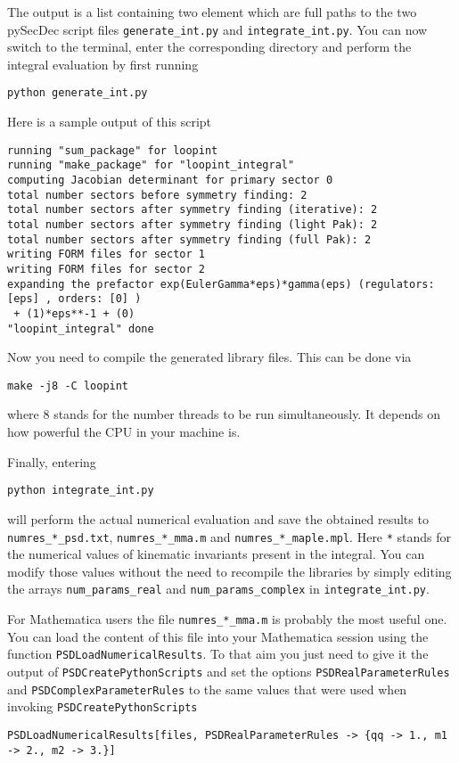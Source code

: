 \documentclass[../FeynHelpersManual.tex]{subfiles}
\begin{document}
The output is a list containing two element which are full paths to the
two pySecDec script files \texttt{generate_int.py} and
\texttt{integrate_int.py}. You can now switch to the terminal, enter the
corresponding directory and perform the integral evaluation by first
running

\begin{verbatim}
python generate_int.py
\end{verbatim}

Here is a sample output of this script

\begin{verbatim}
running "sum_package" for loopint
running "make_package" for "loopint_integral"
computing Jacobian determinant for primary sector 0
total number sectors before symmetry finding: 2
total number sectors after symmetry finding (iterative): 2
total number sectors after symmetry finding (light Pak): 2
total number sectors after symmetry finding (full Pak): 2
writing FORM files for sector 1
writing FORM files for sector 2
expanding the prefactor exp(EulerGamma*eps)*gamma(eps) (regulators: [eps] , orders: [0] )
 + (1)*eps**-1 + (0)
"loopint_integral" done
\end{verbatim}

Now you need to compile the generated library files. This can be done
via

\begin{verbatim}
make -j8 -C loopint
\end{verbatim}

where 8 stands for the number threads to be run simultaneously. It
depends on how powerful the CPU in your machine is.

Finally, entering

\begin{verbatim}
python integrate_int.py
\end{verbatim}

will perform the actual numerical evaluation and save the obtained
results to \texttt{numres_*_psd.txt}, \texttt{numres_*_mma.m} and
\texttt{numres_*_maple.mpl}. Here \texttt{*} stands for the numerical
values of kinematic invariants present in the integral. You can modify
those values without the need to recompile the libraries by simply
editing the arrays \texttt{num_params_real} and
\texttt{num_params_complex} in \texttt{integrate_int.py}.

For Mathematica users the file \texttt{numres_*_mma.m} is probably the
most useful one. You can load the content of this file into your
Mathematica session using the function \texttt{PSDLoadNumericalResults}.
To that aim you just need to give it the output of
\texttt{PSDCreatePythonScripts} and set the options
\texttt{PSDRealParameterRules} and \texttt{PSDComplexParameterRules} to
the same values that were used when invoking
\texttt{PSDCreatePythonScripts}

\begin{verbatim}
PSDLoadNumericalResults[files, PSDRealParameterRules -> {qq -> 1., m1 -> 2., m2 -> 3.}]
\end{verbatim}
\end{document}
